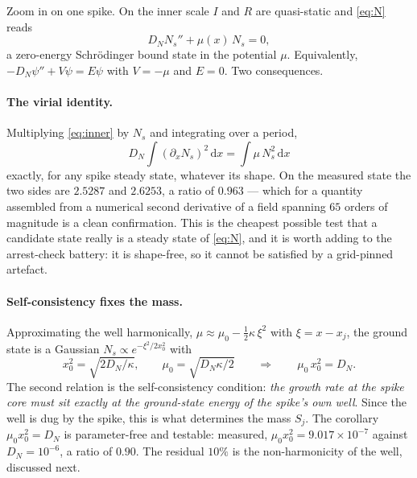 \documentclass[11pt,a4paper]{article}
\newcommand{\Ns}{N_{s}}
\newcommand{\xj}{x_j}
\newcommand{\dd}{\,\mathrm{d}}
\theoremstyle{plain}
\theoremstyle{remark}
\begin{document}
Zoom in on one spike. On the inner scale $I$ and $R$ are quasi-static and
\eqref{eq:N} reads
\begin{equation}
  D_N \Ns'' + \mu(x)\,\Ns = 0 ,
\label{eq:inner}
\end{equation}
a zero-energy Schr\"odinger bound state in the potential $\mu$. Equivalently,
$-D_N\psi'' + V\psi = E\psi$ with $V = -\mu$ and $E = 0$. Two consequences.

\paragraph{The virial identity.} Multiplying \eqref{eq:inner} by $\Ns$ and
integrating over a period,
\begin{equation}
  \boxed{\;D_N \int (\partial_x \Ns)^2 \dd x = \int \mu\,\Ns^2 \dd x\;}
\label{eq:virial}
\end{equation}
exactly, for any spike steady state, whatever its shape. On the measured state
the two sides are $2.5287$ and $2.6253$, a ratio of $0.963$ --- which for a
quantity assembled from a numerical second derivative of a field spanning $65$
orders of magnitude is a clean confirmation. This is the cheapest possible test
that a candidate state really is a steady state of \eqref{eq:N}, and it is
worth adding to the arrest-check battery: it is shape-free, so it cannot be
satisfied by a grid-pinned artefact.

\paragraph{Self-consistency fixes the mass.} Approximating the well
harmonically, $\mu \approx \mu_0 - \tfrac12\kappa\,\xi^2$ with
$\xi = x - \xj$, the ground state is a Gaussian $\Ns \propto
e^{-\xi^2/2x_0^2}$ with
\begin{equation}
  x_0^2 = \sqrt{2D_N/\kappa}, \qquad \mu_0 = \sqrt{D_N\kappa/2}
  \qquad\Longrightarrow\qquad \mu_0\,x_0^2 = D_N .
\label{eq:selfcons}
\end{equation}
The second relation is the self-consistency condition: \emph{the growth rate at
the spike core must sit exactly at the ground-state energy of the spike's own
well}. Since the well is dug by the spike, this is what determines the mass
$S_j$. The corollary $\mu_0 x_0^2 = D_N$ is parameter-free and testable:
measured, $\mu_0 x_0^2 = 9.017\times10^{-7}$ against $D_N = 10^{-6}$, a ratio of
$0.90$. The residual $10\%$ is the non-harmonicity of the well, discussed next.
\end{document}
